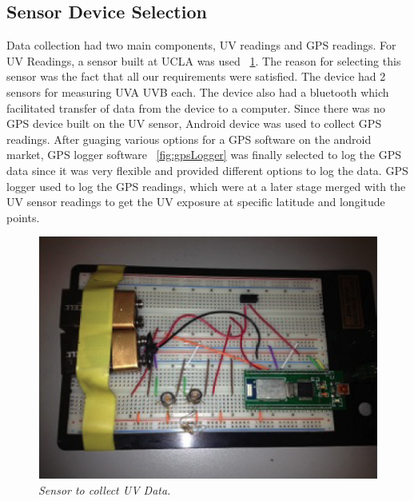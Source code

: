 \documentclass[12pt,fullpage,doublespace]{article}
\begin{document}
\subsection{Sensor Device Selection}
Data collection had two main components, UV readings and GPS readings. For UV Readings, a sensor built at UCLA was used ~\ref{fig:uvSensor}. The reason for selecting this sensor was the fact that all our requirements were satisfied. The device had 2 sensors for measuring UVA  UVB each. The device also had a bluetooth which facilitated transfer of data from the device to a computer. Since there was no GPS device built on the UV sensor, Android device was used to collect GPS readings. After guaging various options for a GPS software on the android market, GPS logger software ~\ref{fig:gpsLogger} was finally selected to log the GPS data since it was very flexible and provided different options to log the data. GPS logger used to log the GPS readings, which were at a later stage merged with the UV sensor readings to get the UV exposure at specific latitude and longitude points. 
\begin{figure}
\begin{center}
\includegraphics[scale=0.55]{uvSensor.png}
\caption{\small \sl Sensor to collect UV Data.\label{fig:uvSensor}}
\end{center}
\end{figure}
\end{document}

